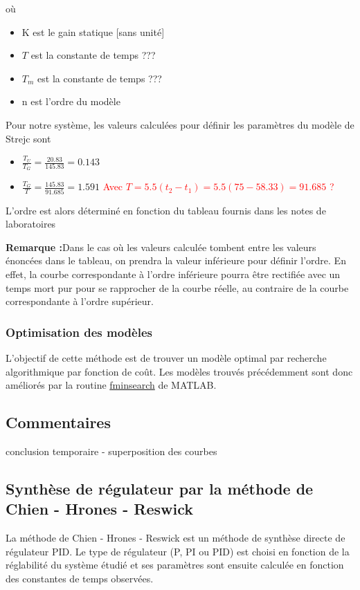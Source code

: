 où 
\begin{itemize}
\item K est le gain statique [sans unité]
\item $T$ est la constante de temps ???
\item $T_{m}$ est la constante de temps ???
\item n est l'ordre du modèle
\end{itemize}

Pour notre système, les valeurs calculées pour définir les paramètres du modèle de Strejc sont
\begin{itemize}
\item $\frac{T_{U}}{T_{G}} = \frac{20.83}{145.83} = 0.143$
\item $\frac{T_{G}}{T} = \frac{145.83}{91.685} = 1.591 $
\textcolor{red}{Avec $T = 5.5 (t_{2} - t_{1}) = 5.5 (75 - 58.33) = 91.685$ ?}
\end{itemize}

L'ordre est alors déterminé en fonction du tableau fournis dans les notes de laboratoires 

\textbf{Remarque :}Dans le cas où les valeurs calculée tombent entre les valeurs énoncées dans le tableau, on prendra la valeur inférieure pour définir l'ordre. En effet, la courbe correspondante à l'ordre inférieure pourra être rectifiée avec un temps mort pur pour se rapprocher de la courbe réelle, au contraire de la courbe correspondante à l'ordre supérieur. 

\subsubsection{Optimisation des modèles}
L'objectif de cette méthode est de trouver un modèle optimal par recherche algorithmique par fonction de coût. Les modèles trouvés précédemment sont donc améliorés par la routine \url{fminsearch} de MATLAB.


\subsection{Commentaires}
conclusion temporaire - superposition des courbes 

\subsection{Synthèse de régulateur par la méthode de Chien - Hrones - Reswick}
La méthode de Chien - Hrones - Reswick est un méthode de synthèse directe de régulateur PID. Le type de régulateur (P, PI ou PID) est choisi en fonction de la réglabilité du système étudié et ses paramètres sont ensuite calculée en fonction des constantes de temps observées. 

